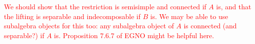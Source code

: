 \documentclass[12pt, reqno]{amsart}
\numberwithin{equation}{section}
\theoremstyle{plainspace}
\theoremstyle{definitionspace}
\theoremstyle{remarkspace}
\newcommand{\id}{\textup{id}}
\newcommand{\mathcat}[1]{\mathcal{#1}}
\newcommand{\Ob}{\textup{Ob}}
\newcommand{\Hom}[2][]{
	\ifthenelse{\equal{#2}{}}
		{\textup{Hom}_{#1}}
		{\textup{Hom}_{#1}\!\left(#2\right)}
}
\begin{document}
\noindent \textcolor{red}{We should show that the restriction is semisimple and connected if $A$ is, and that the lifting is separable and indecomposable if $B$ is. We may be able to use subalgebra objects for this too: any subalgebra object of $A$ is connected (and separable?) if $A$ is. Proposition 7.6.7 of EGNO might be helpful here.}
\newline



\end{document}
